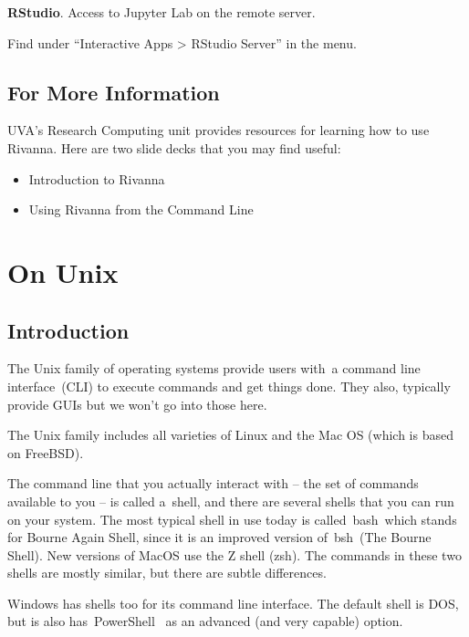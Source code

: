 \documentclass[
  letterpaper,
  DIV=11,
  numbers=noendperiod]{scrreport}
\providecommand{\tightlist}{%
  \setlength{\itemsep}{0pt}\setlength{\parskip}{0pt}}\usepackage{longtable,booktabs,array}
\begin{document}
\textbf{RStudio}. Access to Jupyter Lab on the remote server.

Find under ``Interactive Apps \textgreater{} RStudio Server'' in the
menu.

\hypertarget{for-more-information}{%
\section{For More Information}\label{for-more-information}}

UVA's Research Computing unit provides resources for learning how to use
Rivanna. Here are two slide decks that you may find useful:

\begin{itemize}
\tightlist
\item
  Introduction to Rivanna
\item
  Using Rivanna from the Command Line
\end{itemize}

\hypertarget{on-unix}{%
\chapter{On Unix}\label{on-unix}}

\hypertarget{introduction-1}{%
\section{Introduction}\label{introduction-1}}

The Unix family of operating systems provide users with~a command line
interface~(CLI) to execute commands and get things done. They also,
typically provide GUIs but we won't go into those here.

The Unix family includes all varieties of Linux and the Mac OS (which is
based on FreeBSD).

The command line that you actually interact with -- the set of commands
available to you -- is called a~shell, and there are several shells that
you can run on your system. The most typical shell in use today is
called~bash~which stands for Bourne Again Shell, since it is an improved
version of~bsh~(The Bourne Shell). New versions of MacOS use the Z shell
(zsh). The commands in these two shells are mostly similar, but there
are subtle differences.

Windows has shells too for its command line interface. The default shell
is DOS, but is also has~PowerShell~ as an advanced (and very capable)
option.
\end{document}
